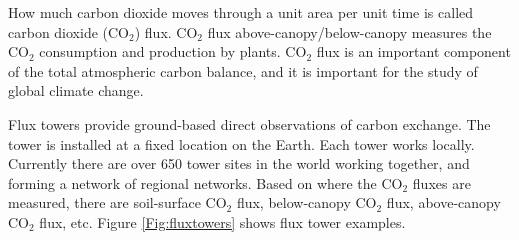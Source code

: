 \documentclass{article}
\begin{document}
How much carbon dioxide moves through a unit area per unit time is called carbon dioxide (CO$_2$) flux. 
CO$_2$ flux above-canopy/below-canopy measures the CO$_2$ consumption and production by plants.
CO$_2$ flux is an important component of the total atmospheric carbon balance, and it is important for the study of global climate change. 

Flux towers provide ground-based direct observations of carbon exchange. The tower is installed at a fixed location on the Earth.  Each tower works locally. Currently there are over 650 tower sites in the world working together, and forming a network of regional networks. 
Based on where the CO$_2$ fluxes are measured, there are soil-surface CO$_2$ flux, below-canopy CO$_2$ flux, above-canopy CO$_2$ flux, etc. Figure \ref{Fig:fluxtowers} shows flux tower examples.
\end{document}
